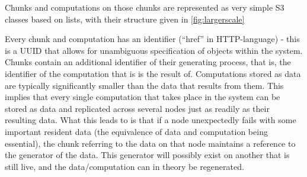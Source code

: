 Chunks and computations on those chunks are represented as very simple S3 classes based on lists, with their structure given in \cref{fig:largerscale}


Every chunk and computation has an identifier (``href'' in HTTP-language) - this is a UUID that allows for unambiguous specification of objects within the system.
Chunks contain an additional identifier of their generating process, that is, the identifier of the computation that is is the result of.
Computations stored as data are typically significantly smaller than the data that results from them.
This implies that every single computation that takes place in the system can be stored as data and replicated across several nodes just as readily as their resulting data.
What this leads to is that if a node unexpectedly fails with some important resident data (the equivalence of data and computation being essential), the chunk referring to the data on that node maintains a reference to the generator of the data.
This generator will possibly exist on another that is still live, and the data/computation can in theory be regenerated.

